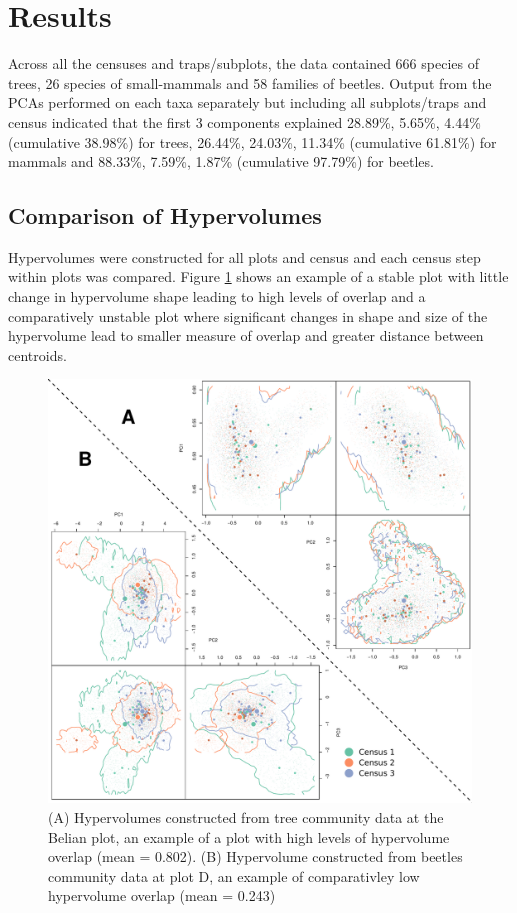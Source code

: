 \section{Results}

Across all the censuses and traps/subplots, the data contained 666 species of trees, 26 species of small-mammals and 58 families of beetles. Output from the PCAs performed on each taxa separately but including all subplots/traps and census indicated that the first 3 components explained 28.89\%, 5.65\%, 4.44\% (cumulative 38.98\%) for trees, 26.44\%, 24.03\%, 11.34\% (cumulative 61.81\%) for mammals and 88.33\%, 7.59\%, 1.87\% (cumulative 97.79\%) for beetles.


\subsection{Comparison of Hypervolumes}

Hypervolumes were constructed for all plots and census and each census step within plots was compared. Figure \ref{fig:1} shows an example of a stable plot with little change in hypervolume shape leading to high levels of overlap and a comparatively unstable plot where significant changes in shape and size of the hypervolume lead to smaller measure of overlap and greater distance between centroids.

\begin{figure}[H]
	\centering
	\includegraphics[width=\textwidth]{figures/figure1.pdf}
	\caption{(A) Hypervolumes constructed from tree community data at the Belian plot, an example of a plot with high levels of hypervolume overlap (mean = 0.802). (B) Hypervolume constructed from beetles community data at plot D, an example of comparativley low hypervolume overlap (mean = 0.243)}
	\label{fig:1}
\end{figure}	


